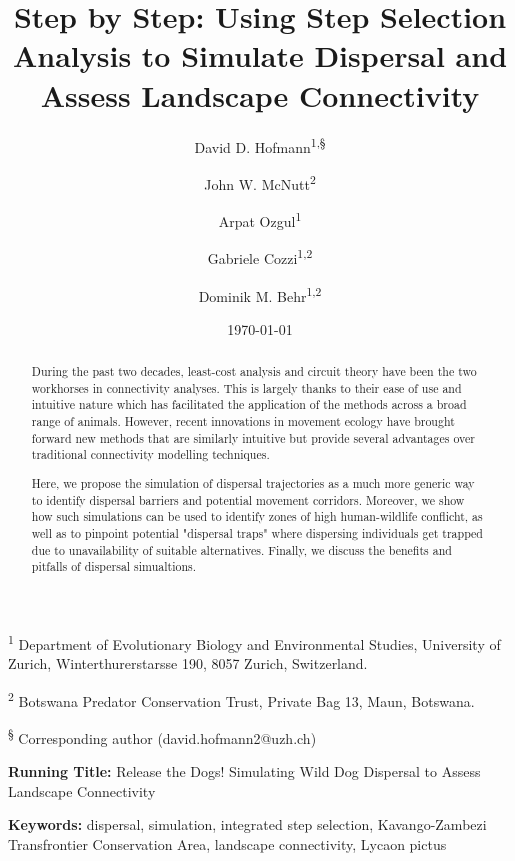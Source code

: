 \documentclass[abstract=on,10pt,a4paper,bibliography=totocnumbered]{article}
\title{Step by Step: Using Step Selection Analysis to Simulate Dispersal and
Assess Landscape Connectivity}
\author{
  David D. Hofmann\textsuperscript{1,\S} \and
  John W. McNutt\textsuperscript{2} \and
  Arpat Ozgul\textsuperscript{1} \and
  Gabriele Cozzi\textsuperscript{1,2} \and
  Dominik M. Behr\textsuperscript{1,2}
}
\date{\today}
\begin{document}



\maketitle

\begin{flushleft}

\vspace{0.5cm}

\textsuperscript{1} Department of Evolutionary Biology and Environmental
Studies, University of Zurich, Winterthurerstarsse 190, 8057 Zurich,
Switzerland.

\textsuperscript{2} Botswana Predator Conservation Trust, Private Bag 13, Maun,
Botswana.

\textsuperscript{\S} Corresponding author (david.hofmann2@uzh.ch)

\vspace{4cm}

\textbf{Running Title:} Release the Dogs! Simulating Wild Dog Dispersal to
Assess Landscape Connectivity

\vspace{0.5cm}

\textbf{Keywords:} dispersal, simulation, integrated step selection,
Kavango-Zambezi Transfrontier Conservation Area, landscape connectivity, Lycaon
pictus

\end{flushleft}

\newpage
\begin{abstract}

During the past two decades, least-cost analysis and circuit theory have been
the two workhorses in connectivity analyses. This is largely thanks to their
ease of use and intuitive nature which has facilitated the application of the
methods across a broad range of animals. However, recent innovations in movement
ecology have brought forward new methods that are similarly intuitive but
provide several advantages over traditional connectivity modelling techniques.

Here, we propose the simulation of dispersal trajectories as a much more generic
way to identify dispersal barriers and potential movement corridors. Moreover,
we show how such simulations can be used to identify zones of high
human-wildlife conflicht, as well as to pinpoint potential "dispersal traps"
where dispersing individuals get trapped due to unavailability of suitable
alternatives. Finally, we discuss the benefits and pitfalls of dispersal
simualtions.
\end{abstract}
\end{document}
